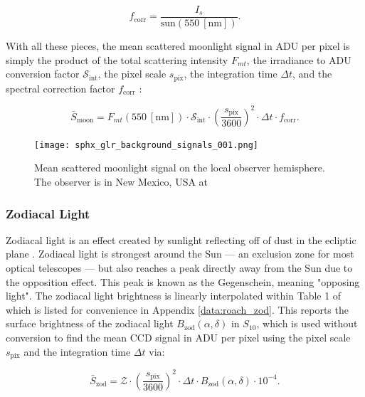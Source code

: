 \begin{equation} \label{eq:krag_f_corr}
  f_\mathrm{corr} = \frac{I_s}{\mathrm{sun}(550 \: \left[\textrm{nm}\right])}.
\end{equation}

With all these pieces, the mean scattered moonlight signal in ADU per pixel is simply the product of the total scattering intensity $F_{mt}$, the irradiance to ADU conversion factor $\mathcal{S}_\mathrm{int}$, the pixel scale $s_\mathrm{pix}$, the integration time $\Delta t$, and the spectral correction factor $f_\mathrm{corr}$ \cite{krag2003}:

\begin{equation} \label{eq:moonlight_adu}
  \bar{S}_\mathrm{moon} = F_{mt}(550 \: \left[\textrm{nm}\right]) \cdot \mathcal{S}_\mathrm{int} \cdot \left( \frac{s_\mathrm{pix}}{3600} \right)^2 \cdot \Delta t \cdot f_\mathrm{corr}.
\end{equation}

\begin{figure}[ht]
  \centering
  \texttt{[image: sphx\_glr\_background\_signals\_001.png]}
  \caption{Mean scattered moonlight signal on the local observer hemisphere. The observer is in New Mexico, USA at
  \pogslla}
  \label{fig:moonlight_hemi}
\end{figure}

\subsubsection{Zodiacal Light}

Zodiacal light is an effect created by sunlight reflecting off of dust in the ecliptic plane \cite{krag2003}. Zodiacal light is strongest around the Sun --- an exclusion zone for most optical telescopes --- but also reaches a peak directly away from the Sun due to the opposition effect. This peak is known as the Gegenschein, meaning "opposing light". The zodiacal light brightness is linearly interpolated within Table 1 of \cite{roach1972} which is listed for convenience in Appendix \ref{data:roach_zod}. This reports the surface brightness of the zodiacal light $B_\mathrm{zod}(\alpha, \delta)$ in $S_{10}$, which is used without conversion to find the mean CCD signal in ADU per pixel using the pixel scale $s_\mathrm{pix}$ and the integration time $\Delta t$ via:

\begin{equation} \label{eq:zodiacal_adu}
  \bar{S}_\mathrm{zod} = \mathcal{Z} \cdot \left( \frac{s_\mathrm{pix}}{3600} \right)^2 \cdot \Delta t \cdot B_\mathrm{zod}(\alpha, \delta) \cdot 10^{-4}.
\end{equation}


